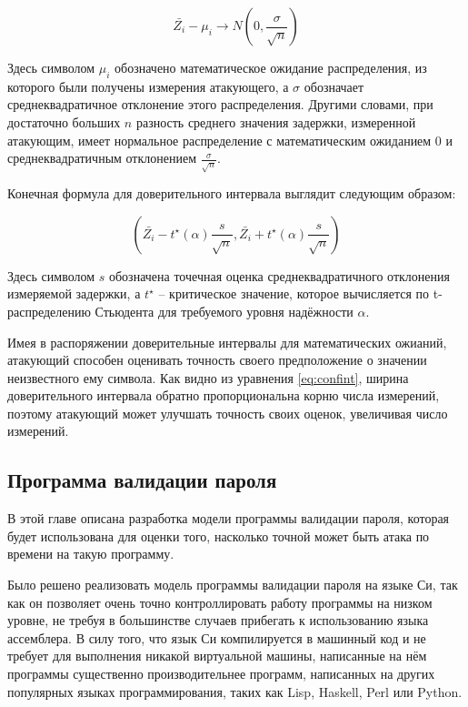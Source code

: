 \begin{equation}
\bar{Z_i} - \mu_i \to N(0, \frac{\sigma}{\sqrt{n}})
\end{equation} \label{eq:clt}

Здесь символом $\mu_i$ обозначено математическое ожидание распределения,
из которого были получены измерения атакующего, а $\sigma$ обозначает
среднеквадратичное отклонение этого распределения. Другими словами, при
достаточно больших $n$ разность среднего значения задержки, измеренной
атакующим, имеет нормальное распределение с математическим ожиданием $0$ и
среднеквадратичным отклонением $\frac{\sigma}{\sqrt{n}}$.

Конечная формула для доверительного интервала выглядит следующим образом:

\begin{equation}
(\bar{Z_i} - t^{\star}(\alpha) \frac{s}{\sqrt{n}}, \bar{Z_i} + t^{\star}(\alpha) \frac{s}{\sqrt{n}})
\end{equation} \label{eq:confint}

Здесь символом $s$ обозначена точечная оценка среднеквадратичного отклонения
измеряемой задержки, а $t^{\star}$ -- критическое значение, которое вычисляется
по t-распределению Стьюдента для требуемого уровня надёжности $\alpha$.

Имея в распоряжении доверительные интервалы для математических ожианий,
атакующий способен оценивать точность своего предположение о значении
неизвестного ему символа. Как видно из уравнения \ref{eq:confint}, ширина
доверительного интервала обратно пропорциональна корню числа измерений,
поэтому атакующий может улучшать точность своих оценок, увеличивая число
измерений.

\subsection{Программа валидации пароля}

В этой главе описана разработка модели программы валидации пароля, которая будет
использована для оценки того, насколько точной может быть атака по времени на
такую программу.

Было решено реализовать модель программы валидации пароля на языке Си, так
как он позволяет очень точно контроллировать работу программы на низком
уровне, не требуя в большинстве случаев прибегать к использованию языка
ассемблера. В силу того, что язык Си компилируется в машинный код и не требует
для выполнения никакой виртуальной машины, написанные на нём программы
существенно производительнее программ, написанных на других популярных языках
программирования, таких как Lisp, Haskell, Perl или Python.

